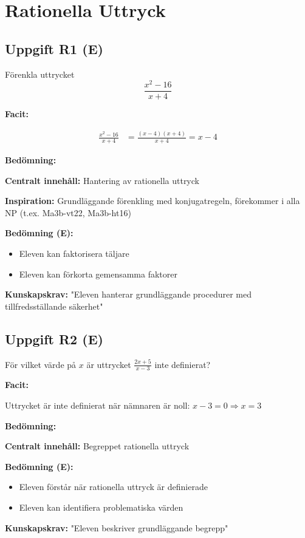 \documentclass[12pt]{article}
\begin{document}
\newpage

\section{Rationella Uttryck}

\subsection*{Uppgift R1 (E)}
Förenkla uttrycket
\[
\frac{x^2 - 16}{x + 4}
\]

\begin{facitbox}
\textbf{Facit:}

\begin{align*}
\frac{x^2 - 16}{x + 4} &= \frac{(x - 4)(x + 4)}{x + 4} = x - 4
\end{align*}
\end{facitbox}

\begin{refbox}
\textbf{Bedömning:}

\textbf{Centralt innehåll:} Hantering av rationella uttryck

\textbf{Inspiration:} Grundläggande förenkling med konjugatregeln, förekommer i alla NP (t.ex. Ma3b-vt22, Ma3b-ht16)

\textbf{Bedömning (E):}
\begin{itemize}
    \item Eleven kan faktorisera täljare
    \item Eleven kan förkorta gemensamma faktorer
\end{itemize}

\textbf{Kunskapskrav:} "Eleven hanterar grundläggande procedurer med tillfredsställande säkerhet"
\end{refbox}

\subsection*{Uppgift R2 (E)}
För vilket värde på $x$ är uttrycket $\frac{2x + 5}{x - 3}$ inte definierat?

\begin{facitbox}
\textbf{Facit:}

Uttrycket är inte definierat när nämnaren är noll: $x - 3 = 0 \Rightarrow x = 3$
\end{facitbox}

\begin{refbox}
\textbf{Bedömning:}

\textbf{Centralt innehåll:} Begreppet rationella uttryck

\textbf{Bedömning (E):}
\begin{itemize}
    \item Eleven förstår när rationella uttryck är definierade
    \item Eleven kan identifiera problematiska värden
\end{itemize}

\textbf{Kunskapskrav:} "Eleven beskriver grundläggande begrepp"
\end{refbox}
\end{document}
